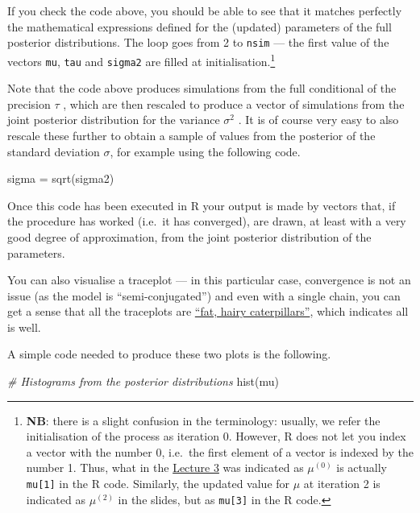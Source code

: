 \documentclass[
]{article}
\newenvironment{Shaded}{\begin{snugshade}}{\end{snugshade}}
\newcommand{\CommentTok}[1]{\textcolor[rgb]{0.56,0.35,0.01}{\textit{#1}}}
\newcommand{\FunctionTok}[1]{\textcolor[rgb]{0.00,0.00,0.00}{#1}}
\newcommand{\NormalTok}[1]{#1}
\newcommand{\OtherTok}[1]{\textcolor[rgb]{0.56,0.35,0.01}{#1}}
\begin{document}
If you check the code above, you should be able to see that it matches
perfectly the mathematical expressions defined for the (updated)
parameters of the full posterior distributions. The loop goes from 2 to
\texttt{nsim} --- the first value of the vectors \texttt{mu},
\texttt{tau} and \texttt{sigma2} are filled at
initialisation.\footnote{\textbf{NB}: there is a slight confusion in the
  terminology: usually, we refer the initialisation of the process as
  iteration 0. However, R does not let you index a vector with the
  number 0, i.e.~the first element of a vector is indexed by the number
  1. Thus, what in the
  \href{https://egon.stats.ucl.ac.uk/static/stat0019/slides/03_MCMC/\#24}{Lecture
  3} was indicated as \(\mu^{(0)}\) is actually \texttt{mu{[}1{]}} in
  the R code. Similarly, the updated value for \(\mu\) at iteration 2 is
  indicated as \(\mu^{(2)}\) in the slides, but as \texttt{mu{[}3{]}} in
  the R code.}

Note that the code above produces simulations from the full conditional
of the precision \(\tau\) , which are then rescaled to produce a vector
of simulations from the joint posterior distribution for the variance
\(\sigma^2\) . It is of course very easy to also rescale these further
to obtain a sample of values from the posterior of the standard
deviation \(\sigma\), for example using the following code.

\begin{Shaded}
\begin{Highlighting}[]
\NormalTok{sigma }\OtherTok{=} \FunctionTok{sqrt}\NormalTok{(sigma2)}
\end{Highlighting}
\end{Shaded}

Once this code has been executed in R your output is made by vectors
that, if the procedure has worked (i.e.~it has converged), are drawn, at
least with a very good degree of approximation, from the joint posterior
distribution of the parameters.

You can also visualise a traceplot --- in this particular case,
convergence is not an issue (as the model is ``semi-conjugated'') and
even with a single chain, you can get a sense that all the traceplots
are
\href{https://egon.stats.ucl.ac.uk/static/stat0019/slides/03_MCMC/\#31}{``fat,
hairy caterpillars''}, which indicates all is well.

A simple code needed to produce these two plots is the following.

\begin{Shaded}
\begin{Highlighting}[]
\CommentTok{\# Histograms from the posterior distributions}
\FunctionTok{hist}\NormalTok{(mu)}
\end{Highlighting}
\end{Shaded}
\end{document}
